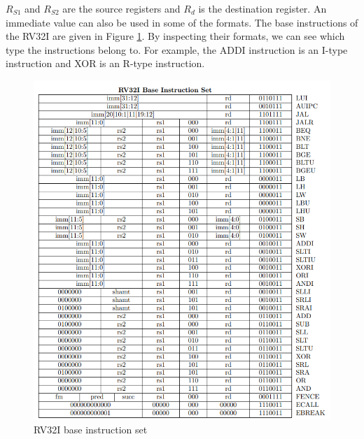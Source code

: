 $R_{S1}$ and $R_{S2}$ are the source registers and $R_d$ is the destination register. An immediate value can also be used in some of the formats. 
The base instructions of the RV32I are given in Figure \ref{fig:rv32i_base_instruction_set}. By inspecting their formats, we can see which type the instructions belong to. For example, the ADDI instruction is an I-type instruction and XOR is an R-type instruction.

\begin{figure}[h!]
    \centering
    \includegraphics{riscv/rv32i_base_instruction_set.png}
    \caption{RV32I base instruction set \cite{rvmanual}}
    \label{fig:rv32i_base_instruction_set}
\end{figure}

